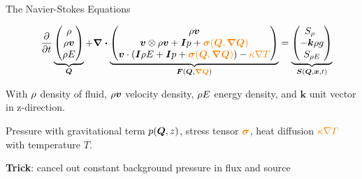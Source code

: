 \documentclass[aspectratio=169]{beamer}
\begin{document}
\begin{frame}{The Navier-Stokes Equations}
\newcommand{\diffCoeff}{\varepsilon}%
\newcommand{\hyperFluxDef}{
  \begin{pmatrix}
    \Qj \\
    \Qv  \otimes \Qj + \bm{I} \pressure  \\
    \Qv \cdot (\bm{I} \QE + \bm{I} \pressure)
  \end{pmatrix}
}%
\newcommand{\viscFluxDef}{
  \begin{pmatrix}
    0\\
     \stressT (\Q, \gradQ)  \\
     \Qv \cdot \stressT (\Q, \gradQ) - \kappa \gradient{T}
   \end{pmatrix}
}%

  \begin{equation}
 \label{eq:equation-set} 
\quad
  \pdv{}{t}
  \underbrace{
  \begin{pmatrix}
    \Qrho\\
    \Qj\\
    \QE
    \end{pmatrix}}_{\Q}
  +
  \divergence{\underbrace{
  \begin{pmatrix}
    \Qj \\
    \Qv  \otimes \Qj + \bm{I} \pressure + \textcolor{orange}{\stressT (\Q, \gradQ)}  \\
    \Qv \cdot \left(\bm{I} \QE + \bm{I} \pressure + \textcolor{orange}{\stressT (\Q, \gradQ)} \right) -
    \textcolor{orange}{\kappa \nabla T}
  \end{pmatrix}}}_{\flux(\Q, \textcolor{orange}{\gradQ})}
 =
  \underbrace{
  \begin{pmatrix}
    \source[\Qrho\phantom{\Qrho}]\\
    - \bm{k} \Qrho g\\
    \source[\QE]
    \end{pmatrix}}_{\source(\Q, \bm{x}, t)}
\end{equation}

With $\rho$ density of fluid, $\rho \bm{v}$ velocity density, $\rho E$ energy density, and $\bm{k}$ unit vector in z-direction.

Pressure with gravitational term $p(\bm{Q}, z)$,
stress tensor $\textcolor{orange}{\bm{\sigma}}$, heat diffusion $\textcolor{orange}{\kappa \nabla T}$ with temperature $T$.

\textbf{Trick}: cancel out constant background pressure in flux and source

\end{frame}
\end{document}
